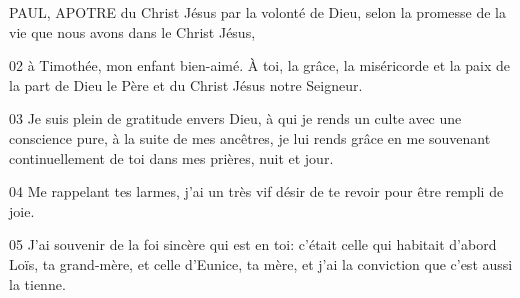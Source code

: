 PAUL, APOTRE du Christ Jésus par la volonté de Dieu, selon la promesse de la vie que nous avons dans le Christ Jésus,

02 à Timothée, mon enfant bien-aimé. À toi, la grâce, la miséricorde et la paix de la part de Dieu le Père et du Christ Jésus notre Seigneur.

03 Je suis plein de gratitude envers Dieu, à qui je rends un culte avec une conscience pure, à la suite de mes ancêtres, je lui rends grâce en me souvenant continuellement de toi dans mes prières, nuit et jour.

04 Me rappelant tes larmes, j’ai un très vif désir de te revoir pour être rempli de joie.

05 J’ai souvenir de la foi sincère qui est en toi: c’était celle qui habitait d’abord Loïs, ta grand-mère, et celle d’Eunice, ta mère, et j’ai la conviction que c’est aussi la tienne.
